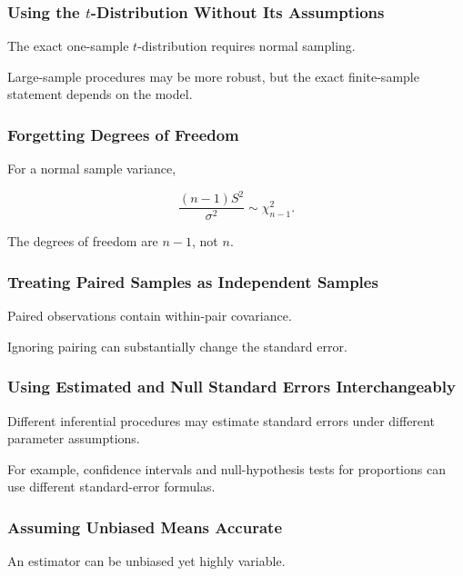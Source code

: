 \subsubsection{Using the \(t\)-Distribution Without Its Assumptions}

The exact one-sample \(t\)-distribution requires normal sampling.

Large-sample procedures may be more robust, but the exact finite-sample
statement depends on the model.

\subsubsection{Forgetting Degrees of Freedom}

For a normal sample variance,

\[
\boxed{
\frac{
(n-1)S^2
}{
\sigma^2
}
\sim
\chi^2_{n-1}.
}
\]

The degrees of freedom are \(n-1\), not \(n\).

\subsubsection{Treating Paired Samples as Independent Samples}

Paired observations contain within-pair covariance.

Ignoring pairing can substantially change the standard error.

\subsubsection{Using Estimated and Null Standard Errors Interchangeably}

Different inferential procedures may estimate standard errors under
different parameter assumptions.

For example, confidence intervals and null-hypothesis tests for
proportions can use different standard-error formulas.

\subsubsection{Assuming Unbiased Means Accurate}

An estimator can be unbiased yet highly variable.

